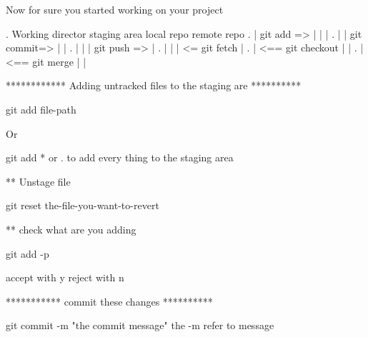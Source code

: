 Now for sure you started working on your project 


. Working director       staging area      local repo        remote repo 
.        |   git add =>        |                |                  |
.        |                     | git commit=>   |                  |
.        |                     |                |   git push =>    |         
.        |                     |                |   <= git fetch   |
.        |              <== git checkout        |                  |
.        |               <==  git merge         |                  |


************  Adding untracked files to the staging are **********

git add file-path 

Or  

git add *   or .   to add every thing to the staging area 

** Unstage file  

git reset  the-file-you-want-to-revert

** check what are you adding 

git add -p 

accept with y  reject with n 

*********** commit these changes **********

git commit -m "the commit message"
  the -m refer to message   